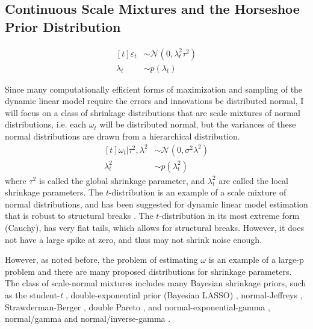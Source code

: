 \documentclass{article}
\newcommand{\paren}[1]{\ensuremath{\left(#1\right)}}
\newcommand{\dnorm}[1]{\ensuremath{\mathcal{N}\paren{#1}}}
\begin{document}
\begin{itemize}
\subsection{Continuous Scale Mixtures and the Horseshoe Prior Distribution}
\label{sec:shrinkage}

\begin{equation}
  \label{eq:4}
  \begin{aligned}[t]
    \varepsilon_{t} &\sim \dnorm{0, \lambda_{t}^{2} \tau^{2}} \\
    \lambda_{t} &\sim p(\lambda_{t})
  \end{aligned}
\end{equation}

Since many computationally efficient forms of maximization and sampling of the dynamic linear model require the errors and innovations be distributed normal, I will focus on a class of shrinkage distributions that are scale mixtures of normal distributions, i.e. each $\omega_{t}$ will be distributed normal, but the variances of these normal distributions are drawn from a hierarchical distribution.
\begin{equation}
  \label{eq:6}
  \begin{aligned}[t]
    \omega_{t} | \tau^{2}, \lambda^{2} & \sim \dnorm{0, \sigma^{2} \lambda^{2}} \\
    \lambda_{t}^{2} & \sim p(\lambda^{2}_{t})
  \end{aligned}
\end{equation}
where $\tau^{2}$ is called the global shrinkage parameter, and $\lambda_{t}^{2}$ are called the local shrinkage parameters.
The $t$-distribution is an example of a scale mixture of normal distributions, and has been suggested for dynamic linear model estimation that is robust to structural breaks \parencites{HarveyKoopman2000}{PetrisPetroneEtAl2009}.
The $t$-distribution in its most extreme form (Cauchy), has very flat tails, which allows for structural breaks.
However, it does not have a large spike at zero, and thus may not shrink noise enough.

However, as noted before, the problem of estimating $\omega$ is an example of a large-p problem and there are many proposed distributions for shrinkage parameters.
The class of scale-normal mixtures includes many Bayesian shrinkage priors, such as the student-\textit{t} \parencite{Tipping2001}, double-exponential prior (Bayesian LASSO) \parencites{LiGoel2006}{ParkCasella2008}{Hans2009}, normal-Jeffreys \parencites{FigueiredoMember2003}{BaeMallick2004}, Strawderman-Berger \parencites{Strawderman1971}{Berger1980}, double Pareto \parencite{ArmaganDunsonLee2011},  and normal-exponential-gamma \parencite{BrownGriffin2005}, normal/gamma and normal/inverse-gamma \parencites{CaronDoucet2008}{BrownGriffin2010}.


\end{itemize}
\end{document}
